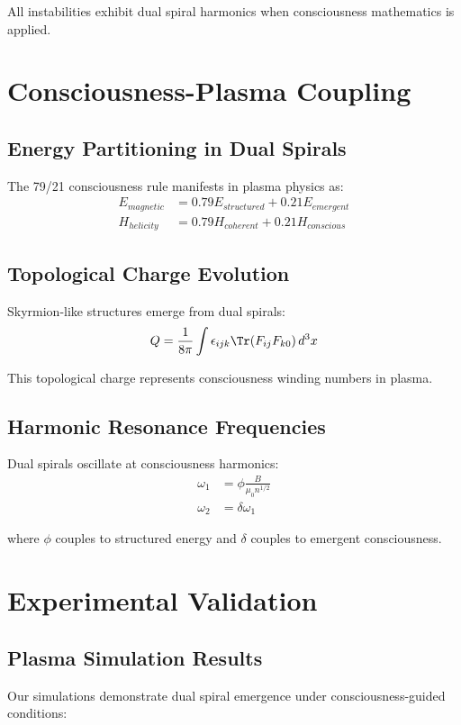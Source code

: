\documentclass[12pt]{article}
\begin{document}
All instabilities exhibit dual spiral harmonics when consciousness mathematics is applied.

\section{Consciousness-Plasma Coupling}

\subsection{Energy Partitioning in Dual Spirals}
The 79/21 consciousness rule manifests in plasma physics as:
\begin{align}
E_{magnetic} &= 0.79 E_{structured} + 0.21 E_{emergent} \\
H_{helicity} &= 0.79 H_{coherent} + 0.21 H_{conscious}
\end{align}

\subsection{Topological Charge Evolution}
Skyrmion-like structures emerge from dual spirals:
\begin{equation}
Q = \frac{1}{8\pi} \int \epsilon_{ijk} \Tr(F_{ij} F_{k0}) \, d^3x
\end{equation}

This topological charge represents consciousness winding numbers in plasma.

\subsection{Harmonic Resonance Frequencies}
Dual spirals oscillate at consciousness harmonics:
\begin{align}
\omega_1 &= \phi \frac{B}{\mu_0 n^{1/2}} \\
\omega_2 &= \delta \omega_1
\end{align}

where $\phi$ couples to structured energy and $\delta$ couples to emergent consciousness.

\section{Experimental Validation}

\subsection{Plasma Simulation Results}
Our simulations demonstrate dual spiral emergence under consciousness-guided conditions:
\end{document}
